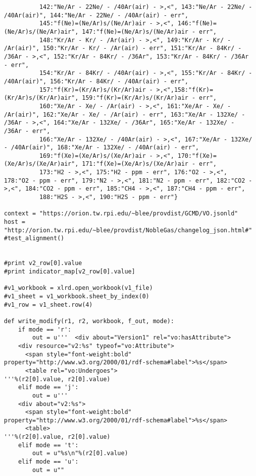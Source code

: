 \begin{verbatim}
		  142:"Ne/Ar - 22Ne/ - /40Ar(air) - >,<", 143:"Ne/Ar - 22Ne/ - /40Ar(air)", 144:"Ne/Ar - 22Ne/ - /40Ar(air) - err",
		  145:"f(Ne)=(Ne/Ar)s/(Ne/Ar)air - >,<", 146:"f(Ne)=(Ne/Ar)s/(Ne/Ar)air", 147:"f(Ne)=(Ne/Ar)s/(Ne/Ar)air - err",
		  148:"Kr/Ar - Kr/ - /Ar(air) - >,<", 149:"Kr/Ar - Kr/ - /Ar(air)", 150:"Kr/Ar - Kr/ - /Ar(air) - err", 151:"Kr/Ar - 84Kr/ - /36Ar - >,<", 152:"Kr/Ar - 84Kr/ - /36Ar", 153:"Kr/Ar - 84Kr/ - /36Ar - err",
		  154:"Kr/Ar - 84Kr/ - /40Ar(air) - >,<", 155:"Kr/Ar - 84Kr/ - /40Ar(air)", 156:"Kr/Ar - 84Kr/ - /40Ar(air) - err",
		  157:"f(Kr)=(Kr/Ar)s/(Kr/Ar)air - >,<",158:"f(Kr)=(Kr/Ar)s/(Kr/Ar)air", 159:"f(Kr)=(Kr/Ar)s/(Kr/Ar)air - err",
		  160:"Xe/Ar - Xe/ - /Ar(air) - >,<", 161:"Xe/Ar - Xe/ - /Ar(air)", 162:"Xe/Ar - Xe/ - /Ar(air) - err", 163:"Xe/Ar - 132Xe/ - /36Ar - >,<", 164:"Xe/Ar - 132Xe/ - /36Ar", 165:"Xe/Ar - 132Xe/ - /36Ar - err",
		  166:"Xe/Ar - 132Xe/ - /40Ar(air) - >,<", 167:"Xe/Ar - 132Xe/ - /40Ar(air)", 168:"Xe/Ar - 132Xe/ - /40Ar(air) - err",
		  169:"f(Xe)=(Xe/Ar)s/(Xe/Ar)air - >,<", 170:"f(Xe)=(Xe/Ar)s/(Xe/Ar)air", 171:"f(Xe)=(Xe/Ar)s/(Xe/Ar)air - err",
		  173:"H2 - >,<", 175:"H2 - ppm - err", 176:"O2 - >,<", 178:"O2 - ppm - err", 179:"N2 - >,<", 181:"N2 - ppm - err", 182:"CO2 - >,<", 184:"CO2 - ppm - err", 185:"CH4 - >,<", 187:"CH4 - ppm - err",
		  188:"H2S - >,<", 190:"H2S - ppm - err"}

context = "https://orion.tw.rpi.edu/~blee/provdist/GCMD/VO.jsonld"
host = "http://orion.tw.rpi.edu/~blee/provdist/NobleGas/changelog_json.html#"
#test_alignment()


#print v2_row[0].value
#print indicator_map[v2_row[0].value]

#v1_workbook = xlrd.open_workbook(v1_file)
#v1_sheet = v1_workbook.sheet_by_index(0)
#v1_row = v1_sheet.row(4)

def write_modify(r1, r2, workbook, f_out, mode):
	if mode == 'r':
		out = u'''  <div about="Version1" rel="vo:hasAttribute">
    <div resource="v2:%s" typeof="vo:Attribute">
      <span style="font-weight:bold" property="http://www.w3.org/2000/01/rdf-schema#label">%s</span>
      <table rel="vo:Undergoes">
'''%(r2[0].value, r2[0].value)
	elif mode == 'j':
		out = u'''
    <div about="v2:%s">
      <span style="font-weight:bold" property="http://www.w3.org/2000/01/rdf-schema#label">%s</span>
      <table>
'''%(r2[0].value, r2[0].value)
	elif mode == 't':
		out = u"%s\n"%(r2[0].value)
	elif mode == 'u':
		out = u""


\end{verbatim}

